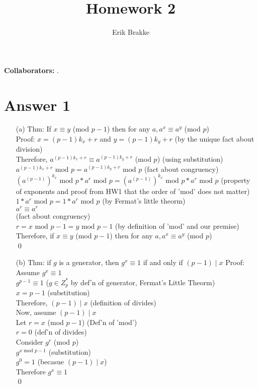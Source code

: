 \documentclass[11pt]{article}
\providecommand{\myparab}[1]{\smallskip\noindent\textbf{#1} }
\theoremstyle{definition}
\begin{document}
\title{Homework 2}
\author{Erik Brakke}
\maketitle

\thispagestyle{fancy}

\myparab{Collaborators: }  .
 
 
\section*{Answer 1}
\begin{enumerate}
	\item[(a)]
	Thm: If $x \equiv y$ (mod $p-1$) then for any $a, a^x \equiv a^y$ (mod $p$)\\
	\newline
	Proof:  $x = (p-1)k_x + r$ and $y = (p-1)k_y + r$ (by the unique fact about division)\\
	Therefore, $a^{(p-1)k_x + r} \equiv a^{(p-1)k_y + r}$ (mod $p$) (using substitution)\\
	$a^{(p-1)k_x + r} \text{ mod } p = a^{(p-1)k_y + r} \text{ mod } p$ (fact about congruency)\\
	$(a^{(p-1)})^{k_x} \text{ mod } p * a^r \text{ mod } p = (a^{(p-1)})^{k_x} \text{ mod } p * a^r \text{ mod } p$ (property of exponents and proof from HW1 that the order of 'mod' does not matter)\\
	$1 * a^r \text{ mod } p = 1 * a^r \text{ mod } p$ (by Fermat's little theorm)\\
	$a^r \equiv a^r$\\ (fact about congruency)\\
	$r = x \text{ mod } p-1 = y \text{ mod } p-1$ (by definition of 'mod' and our premise)\\
	Therefore, if $x \equiv y$ (mod $p-1$) then for any $a, a^x \equiv a^y$ (mod $p$)\\
	\qed

	\item[(b)]
	Thm: if $g$ is a generator, then $g^x \equiv 1$ if and only if $(p-1) \mid x$
	\newline
	Proof: Assume $g^x \equiv 1$\\
	$g^{p-1} \equiv 1$ ($g \in Z^*_p$ by def'n of generator, Fermat's Little Theorm)\\
	$x = p-1$ (substitution)\\
	Therefore, $(p-1) \mid x$ (definition of divides)\\
	\newline
	Now, assume $(p-1) \mid x$\\
	Let $r = x$ (mod $p-1$) (Def'n of 'mod')\\
	$r = 0$ (def'n of divides)\\
	Consider $g^r$ (mod $p$)\\
	$g^{x \text{ mod } p-1}$ (substitution)\\
	$g^0 = 1$ (becasue $(p-1) \mid x$)\\
	Therefore $g^x \equiv 1$\\
	\qed


\end{enumerate}
\end{document}
